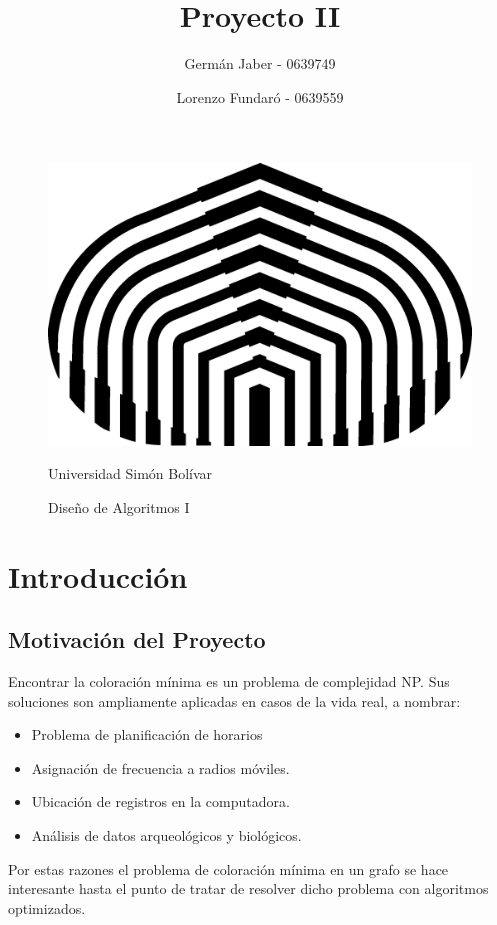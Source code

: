 \documentclass[a4paper,10pt]{article}
\title{Proyecto II}
\author{Germán Jaber - 0639749}
\author{Lorenzo Fundar\'o - 0639559}
\begin{document}
\begin{figure}[t]
\begin{center}
\includegraphics[scale = 0.75]{usb.png}
\end{center}
\begin{center}
\large Universidad Simón Bolívar
\end{center}
\begin{center}
 \large Diseño de Algoritmos I
\end{center}


\end{figure}


\maketitle


\thispagestyle{empty}
\newpage

\tableofcontents{}
\newpage


\section{Introducción}

\subsection{Motivación del Proyecto}
Encontrar la coloración mínima es un problema de complejidad NP. 
Sus soluciones son ampliamente aplicadas en casos de la vida real, a nombrar:
\begin{itemize}
 \item Problema de planificación de horarios
 \item Asignación de frecuencia a radios móviles.
 \item Ubicación de registros en la computadora.
 \item Análisis de datos arqueológicos y biológicos.
\end{itemize}
Por estas razones el problema de coloración mínima en un grafo se hace 
interesante hasta el punto de tratar de resolver dicho problema con 
algoritmos optimizados.
\end{document}
